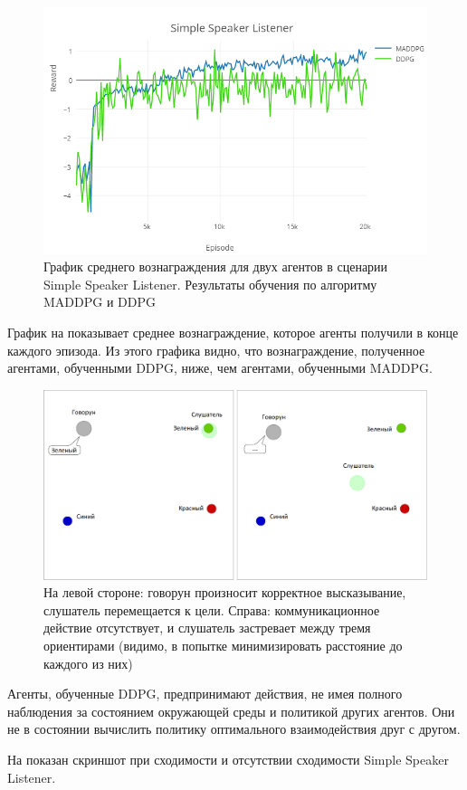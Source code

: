 \begin{figure}[ht!]
    \center
    \includegraphics [scale=0.60] {my_folder/images/ch5/ssl-rew.png}
    \caption{График среднего вознаграждения для двух агентов в сценарии Simple Speaker Listener. Результаты обучения по алгоритму MADDPG и DDPG}
    \label{fig:result-ssl-rew}
\end{figure}

График на  показывает среднее вознаграждение, которое агенты получили в конце каждого эпизода. Из этого графика видно, что вознаграждение, полученное агентами, обученными DDPG, ниже, чем агентами, обученными MADDPG.

\begin{figure}[ht!]
    \center
    \includegraphics [scale=0.45] {my_folder/images/ch5/results-ssl-conv-non-conv.png}
    \caption{На левой стороне: говорун произносит корректное высказывание, слушатель перемещается к цели. Справа: коммуникационное действие отсутствует, и слушатель застревает между тремя ориентирами (видимо, в попытке минимизировать расстояние до каждого из них)}
    \label{fig:result-conv-non-conv}
\end{figure}

Агенты, обученные DDPG, предпринимают действия, не имея полного наблюдения за состоянием окружающей среды и политикой других агентов. Они не в состоянии вычислить политику оптимального взаимодействия друг с другом.

На  показан скриншот при сходимости и отсутствии сходимости Simple Speaker Listener.
